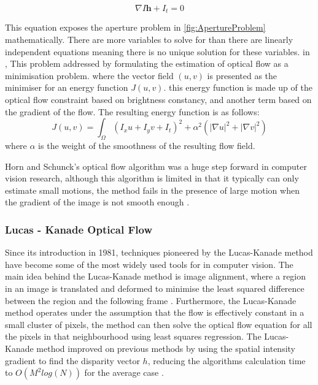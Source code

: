 \documentclass{UoNMCHA}
\numberwithin{equation}{section}
\begin{document}
\begin{equation}
	\nabla I \mathbf{h} + I_{t} = 0
\end{equation}

This equation exposes the aperture problem in \cref{fig:ApertureProblem} mathematically. There are more variables to solve for than there are linearly independent equations meaning there is no unique solution for these variables. in \cite{horn1981determining}, This problem addressed by formulating the estimation of optical flow as a minimisation problem. where the vector field $(u, v)$ is presented as the minimiser for an energy function $J(u, v)$. this energy function is made up of the optical flow constraint based on brightness constancy, and another term based on the gradient of the flow. The resulting energy function is as follows:
\begin{equation}
	J(u, v) = \int_{\Omega}(I_{x}u + I_{y}v + I_{t})^{2} + \alpha^2(|\nabla u|^{2} + |\nabla v|^{2})
\end{equation}
where $\alpha$ is the weight of the smoothness of the resulting flow field.

Horn and Schunck's optical flow algorithm was a huge step forward in computer vision research, although this algorithm is limited in that it typically can only estimate small motions, the method fails in the presence of large motion when the gradient of the image is not smooth enough \citep{meinhardt2013horn}.

\subsubsection{Lucas - Kanade Optical Flow}
Since its introduction in 1981, techniques pioneered by the Lucas-Kanade method have become some of the most widely used tools for in computer vision. The main idea behind the Lucas-Kanade method is image alignment, where a region in an image is translated and deformed to minimise the least squared difference between the region and the following frame \citep{lucasKanade20yearson}. Furthermore, the Lucas-Kanade method operates under the assumption that the flow is effectively constant in a small cluster of pixels, the method can then solve the optical flow equation for all the pixels in that neighbourhood using least squares regression. The Lucas-Kanade method improved on previous methods by using the spatial intensity gradient to find the disparity vector $h$, reducing the algorithms calculation time to $O(M^2log(N))$ for the average case \citep{rojas2010lucas}.
\end{document}
